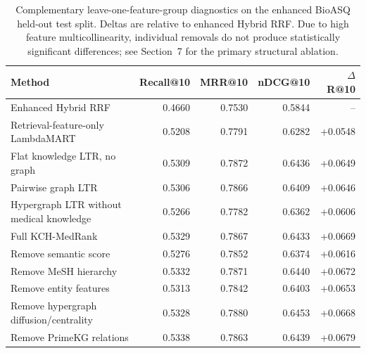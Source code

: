 \begin{table}[t]
\centering
\small
\caption{Complementary leave-one-feature-group diagnostics on the enhanced BioASQ held-out test split. Deltas are relative to enhanced Hybrid RRF. Due to high feature multicollinearity, individual removals do not produce statistically significant differences; see Section~7 for the primary structural ablation.}
\label{tab:kch-ablation-summary}
\begin{tabular}{lrrrr}
\toprule
Method & Recall@10 & MRR@10 & nDCG@10 & $\Delta$R@10 \\
\midrule
Enhanced Hybrid RRF & 0.4660 & 0.7530 & 0.5844 & -- \\
Retrieval-feature-only LambdaMART & 0.5208 & 0.7791 & 0.6282 & +0.0548 \\
Flat knowledge LTR, no graph & 0.5309 & 0.7872 & 0.6436 & +0.0649 \\
Pairwise graph LTR & 0.5306 & 0.7866 & 0.6409 & +0.0646 \\
Hypergraph LTR without medical knowledge & 0.5266 & 0.7782 & 0.6362 & +0.0606 \\
Full KCH-MedRank & 0.5329 & 0.7867 & 0.6433 & +0.0669 \\
Remove semantic score & 0.5276 & 0.7852 & 0.6374 & +0.0616 \\
Remove MeSH hierarchy & 0.5332 & 0.7871 & 0.6440 & +0.0672 \\
Remove entity features & 0.5313 & 0.7842 & 0.6403 & +0.0653 \\
Remove hypergraph diffusion/centrality & 0.5328 & 0.7880 & 0.6453 & +0.0668 \\
Remove PrimeKG relations & 0.5338 & 0.7863 & 0.6439 & +0.0679 \\
\bottomrule
\end{tabular}
\end{table}
